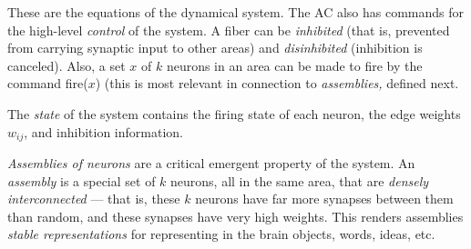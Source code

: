\documentclass[11pt]{article}
\begin{document}
These are the equations of the dynamical system.  The AC also has commands for the  high-level {\em control} of the system. A fiber can be {\em inhibited} (that is, prevented from carrying synaptic input to other areas) and {\em disinhibited} (inhibition is canceled). Also, a set $x$ of $k$ neurons in an area can be made to fire by the command fire($x$) (this is most relevant in connection to {\em assemblies,} defined next.


The {\em state} of the system contains the firing state of each neuron, the edge weights $w_{ij}$, and inhibition information. %

{\em Assemblies of neurons} are a critical emergent property of the system. An {\em assembly} is a special set of $k$ neurons, all in the same area, that are {\em densely interconnected} --- that is, these $k$ neurons have far more synapses between them than random, and these synapses have very high weights.  This renders assemblies {\em stable representations} for representing in the brain objects, words, ideas, etc. 

\end{document}

